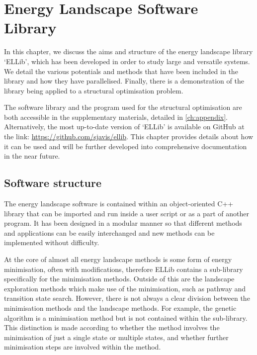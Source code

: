 \chapter{Energy Landscape Software Library}
\label{ch:software}
\graphicspath{{software/fig/}}
In this chapter, we discuss the aims and structure of the energy landscape library `ELLib', which has been developed in order to study large and versatile systems.
We detail the various potentials and methods that have been included in the library and how they have parallelised.
Finally, there is a demonstration of the library being applied to a structural optimisation problem.

The software library and the program used for the structural optimisation are both accessible in the supplementary materials, detailed in \cref{ch:appendix}.
Alternatively, the most up-to-date version of `ELLib' is available on GitHub at the link: \url{https://github.com/sjavis/ellib}.
This chapter provides details about how it can be used and will be further developed into comprehensive documentation in the near future.


\section{Software structure}
The energy landscape software is contained within an object-oriented C++ library that can be imported and run inside a user script or as a part of another program.
It has been designed in a modular manner so that different methods and applications can be easily interchanged and new methods can be implemented without difficulty.

At the core of almost all energy landscape methods is some form of energy minimisation, often with modifications, therefore ELLib contains a sub-library specifically for the minimisation methods.
Outside of this are the landscape exploration methods which make use of the minimisation, such as pathway and transition state search.
However, there is not always a clear division between the minimisation methods and the landscape methods.
For example, the genetic algorithm is a minimisation method but is not contained within the sub-library.
This distinction is made according to whether the method involves the minimisation of just a single state or multiple states, and whether further minimisation steps are involved within the method.

